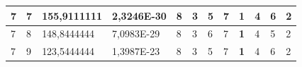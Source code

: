 \documentclass[conference]{IEEEtran}
\begin{document}
\begin{table}[]
\begin{tabular}{|llll|llllllll|}
\multicolumn{1}{|l|}{7}                                                              & \multicolumn{1}{l|}{7}                                                                 & \multicolumn{1}{l|}{155,9111111}                                                           & 2,3246E-30                              & \multicolumn{1}{l|}{8}                                                           & \multicolumn{1}{l|}{3}                                                           & \multicolumn{1}{l|}{5}                                                           & \multicolumn{1}{l|}{7}                                                           & \multicolumn{1}{l|}{\textbf{1}}                                                  & \multicolumn{1}{l|}{4}                                                           & \multicolumn{1}{l|}{6}                                                           & 2                                   \\ \hline
\multicolumn{1}{|l|}{7}                                                              & \multicolumn{1}{l|}{8}                                                                 & \multicolumn{1}{l|}{148,8444444}                                                           & 7,0983E-29                              & \multicolumn{1}{l|}{8}                                                           & \multicolumn{1}{l|}{3}                                                           & \multicolumn{1}{l|}{6}                                                           & \multicolumn{1}{l|}{7}                                                           & \multicolumn{1}{l|}{\textbf{1}}                                                  & \multicolumn{1}{l|}{4}                                                           & \multicolumn{1}{l|}{5}                                                           & 2                                   \\ \hline
\multicolumn{1}{|l|}{7}                                                              & \multicolumn{1}{l|}{9}                                                                 & \multicolumn{1}{l|}{123,5444444}                                                           & 1,3987E-23                              & \multicolumn{1}{l|}{8}                                                           & \multicolumn{1}{l|}{3}                                                           & \multicolumn{1}{l|}{5}                                                           & \multicolumn{1}{l|}{7}                                                           & \multicolumn{1}{l|}{\textbf{1}}                                                  & \multicolumn{1}{l|}{4}                                                           & \multicolumn{1}{l|}{6}                                                           & 2                                   \\ \hline

\end{tabular}
\end{table}
\end{document}
